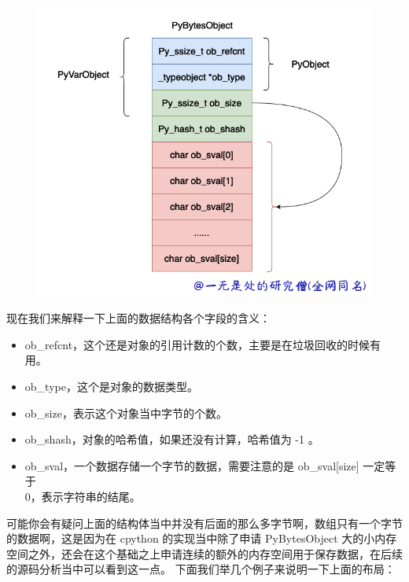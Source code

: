     \begin{figure}[h]
        \centering
            \includegraphics[scale=.25]{images/28-bytes.png}
						\caption{ }
        \label{fig:my_label}
    \end{figure}
    
现在我们来解释一下上面的数据结构各个字段的含义：
\begin{itemize}
\item ob\_refcnt，这个还是对象的引用计数的个数，主要是在垃圾回收的时候有用。 
\item ob\_type，这个是对象的数据类型。 
\item ob\_size，表示这个对象当中字节的个数。 
\item ob\_shash，对象的哈希值，如果还没有计算，哈希值为 -1 。 
\item ob\_sval，一个数据存储一个字节的数据，需要注意的是 ob\_sval[size] 一定等于 \'\\0\' ，表示字符串的结尾。 
\end{itemize}
可能你会有疑问上面的结构体当中并没有后面的那么多字节啊，数组只有一个字节的数据啊，这是因为在 cpython 的实现当中除了申请 PyBytesObject 大的小内存空间之外，还会在这个基础之上申请连续的额外的内存空间用于保存数据，在后续的源码分析当中可以看到这一点。
下面我们举几个例子来说明一下上面的布局：

